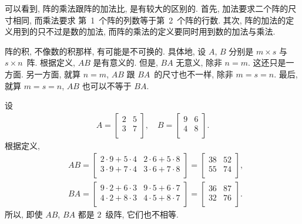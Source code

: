 可以看到, 阵的乘法跟阵的加法比, 是有较大的区别的.
首先, 加法要求二个阵的尺寸相同, 而乘法要求%
第~1~个阵的列数等于第~2~个阵的行数.
其次, 阵的加法的定义用到的只不过是数的加法,
而阵的乘法的定义要同时用到数的加法与乘法.

阵的积, 不像数的积那样, 有可能是不可换的.
具体地,
设 \(A\), \(B\) 分别是 \(m \times s\) 与 \(s \times n\)~阵.
根据定义, \(AB\) 是有意义的.
但是, \(BA\) 无意义, 除非 \(n = m\).
这还只是一方面.
另一方面, 就算 \(n = m\),
\(AB\) 跟 \(BA\)~的尺寸也不一样,
除非 \(m = s = n\).
最后, 就算 \(m = s = n\),
\(AB\) 也可以不等于 \(BA\).

\begin{example}
    设
    \begin{align*}
        A = \begin{bmatrix}
                2 & 5 \\
                3 & 7 \\
            \end{bmatrix},
        \quad
        B = \begin{bmatrix}
                9 & 6 \\
                4 & 8 \\
            \end{bmatrix}.
    \end{align*}
    根据定义,
    \begin{align*}
         &
        AB = \begin{bmatrix}
                 2 \cdot 9 + 5 \cdot 4 & 2 \cdot 6 + 5 \cdot 8 \\
                 3 \cdot 9 + 7 \cdot 4 & 3 \cdot 6 + 7 \cdot 8 \\
             \end{bmatrix}
        = \begin{bmatrix}
              38 & 52 \\
              55 & 74 \\
          \end{bmatrix},
        \\
         &
        BA = \begin{bmatrix}
                 9 \cdot 2 + 6 \cdot 3 & 9 \cdot 5 + 6 \cdot 7 \\
                 4 \cdot 2 + 8 \cdot 3 & 4 \cdot 5 + 8 \cdot 7 \\
             \end{bmatrix}
        = \begin{bmatrix}
              36 & 87 \\
              32 & 76 \\
          \end{bmatrix}.
    \end{align*}
    所以, 即使 \(AB\), \(BA\) 都是 \(2\)~级阵,
    它们也不相等.
\end{example}

